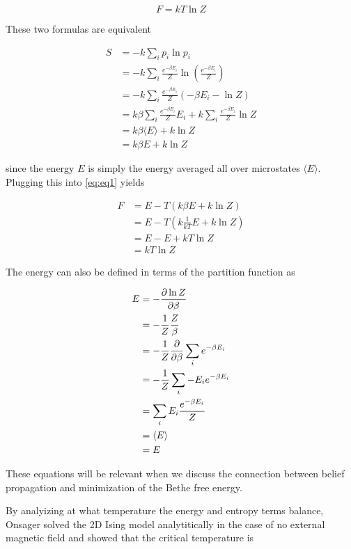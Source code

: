 \documentclass{article}
\begin{document}
\begin{equation}
    F = kT \ln Z
\end{equation}

These two formulas are equivalent


\begin{align}
    S &= -k \sum_i p_i \ln p_i \\
    &= -k \sum_i \frac{e^{-\beta E_i}}{Z} \ln \left(\frac{e^{-\beta E_i}}{Z} \right) \\
    &= -k \sum_i \frac{e^{-\beta E_i}}{Z} (-\beta E_i - \ln Z) \\
    &= k \beta \sum_i \frac{e^{-\beta E_i}}{Z} E_i + k \sum_i \frac{e^{-\beta E_i}}{Z} \ln Z \\
    &= k \beta \langle E \rangle + k \ln Z \\
    &= k \beta E + k \ln Z
\end{align}

since the energy $E$ is simply the energy averaged all over microstates $\langle E \rangle$. 
Plugging this into \eqref{eq:eq1} yields

\begin{align}
    F &= E - T (k \beta E + k \ln Z) \\
    &= E - T (k \frac{1}{kT} E + k \ln Z) \\
    &= E - E + kT \ln Z \\
    &= kT \ln Z
\end{align}

The energy can also be defined in terms of the partition function as

\begin{align}
    E &= -\pdv{\ln Z}{\beta} \\
    &= -\frac{1}{Z} \frac{Z}{\beta} \\
    &= -\frac{1}{Z} \pdv{}{\beta} \sum_i e^{-\beta E_i} \\
    &= -\frac{1}{Z} \sum_i -E_i e^{-\beta E_i} \\
    &= \sum_i E_i \frac{e^{-\beta E_i}}{Z} \\
    &= \langle E \rangle \\
    &= E 
\end{align}

These equations will be relevant when we discuss the connection between belief propagation and minimization of the Bethe free energy.

By analyizing at what temperature the energy and entropy terms balance, Onsager solved the 2D Ising model analytitically in the case of no external magnetic field and showed that the critical temperature is
\end{document}
